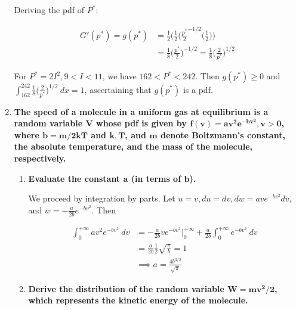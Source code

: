 \documentclass[10pt, oneside]{article}   	%
\theoremstyle{definition}
\begin{document}
\begin{enumerate}[label=5.\arabic*]
Deriving the pdf of $P^*$:

\begin{align*}
G'(p^*) = g(p^*) &= \frac{1}{2} \Big( \frac{1}{2} \Big( \frac{p^*}{2}^{-1/2} \Big( \frac{1}{2} \Big) \Big) \\
&= \frac{1}{8} \Big( \frac{p^*}{2} \Big)^{-1/2} = \boxed{\frac{1}{8} \Big( \frac{2}{p^*} \Big)^{1/2}}
\end{align*}

For $P^* = 2I^2, 9 < I < 11$, we have $162 < P^* < 242$. Then $g(p^*) \geq 0$ and $\int^{242}_{162} \frac{1}{8} \Big( \frac{2}{p^*} \Big)^{1/2} \ dx = \boxed{1}$, ascertaining that $g(p^*)$ is a pdf.

\item  \begin{tcolorbox}[
  colback=Cerulean!5!white,
  colframe=Cerulean!75!black]
\textbf{The speed of a molecule in a uniform gas at equilibrium is a random variable $\bm{V}$ whose pdf is given by $\bm{f(v) = av^2 e^{-bv^2}, v > 0}$, where $\bm{b = m / 2kT}$ and $\bm{k, T}$, and $\bm{m}$ denote Boltzmann's constant, the absolute temperature, and the mass of the molecule, respectively.}
\end{tcolorbox}
	
	\begin{enumerate}
	\item  \begin{tcolorbox}[
	  colback=Cerulean!5!white,
	  colframe=Cerulean!75!black]
	\textbf{Evaluate the constant $\bm{a}$ (in terms of $\bm{b}$).}
	\end{tcolorbox}
	
	We proceed by integration by parts. Let $u = v, du = dv, dw = ave^{-bv^2} dv,$ and $w = -\frac{a}{2b} e^{-bv^2}$. Then
	
	\begin{align*}
	\int^{+\infty}_0 av^2 e^{-bv^2} \ dv &= - \frac{a}{2b} ve^{-bv^2} \Big|^{+\infty}_0 + \frac{a}{2b} \int^{+\infty}_0 e^{-bv^2} \ dv \\
	&= \frac{a}{2b} \frac{1}{2} \sqrt{ \frac{\pi}{b} } = 1 \\
	&\implies \boxed{a = \frac{4b^{3/2}}{\sqrt{\pi}}}
	\end{align*}
	
	\item  \begin{tcolorbox}[
	  colback=Cerulean!5!white,
	  colframe=Cerulean!75!black]
	\textbf{Derive the distribution of the random variable $\bm{W = mv^2 / 2}$, which represents the kinetic energy of the molecule.}
	\end{tcolorbox}
	

\end{enumerate}
\end{enumerate}
\end{document}

